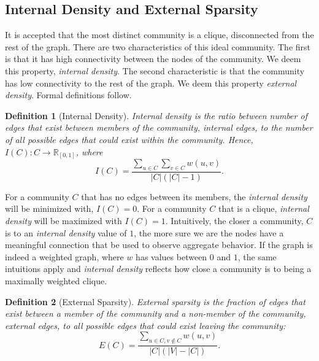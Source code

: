 \documentclass[phd,tocprelim]{cornell}
\newtheorem{definition}{Definition}
\begin{document}
\subsection{Internal Density and External Sparsity}

It is accepted that the most distinct community is a clique, disconnected from the rest of the graph.  There are two characteristics of this ideal community.  The first is that it has high connectivity between the nodes of the community.  We deem this property, {\it internal density}.  The second characteristic is that the community has low connectivity to the rest of the graph.  We deem this property {\it external density}.  Formal definitions follow.

\begin{definition}[Internal Density]
Internal density is the ratio between number of edges that exist between members of the community, {\it internal edges}, to the number of all possible edges that could exist within the community.  Hence, $I(C) : C \rightarrow \mathbb{R}_{[0, 1]}$, where
\begin{equation}
 I(C) =\frac{\sum_{u \in C} \sum_{v \in C} w(u,v)}{|C|(|C| - 1)} .
\end{equation}
\label{def_int_density}
\end{definition}

For a community $C$ that has no edges between its members, the {\it internal density} will be minimized with, $I(C) = 0$.  For a community $C$ that is a clique, {\it internal density} will be maximized with $I(C) = 1$.  Intuitively, the closer a community, $C$ is to an {\it internal density} value of $1$, the more sure we are the nodes have a meaningful connection that be used to observe aggregate behavior.  If the graph is indeed a weighted graph, where $w$ has values between $0$ and $1$, the same intuitions apply and {\it internal density} reflects how close a community is to being a maximally weighted clique.

\begin{definition}[External Sparsity]
External sparsity is the fraction of edges that exist between a member of the community and a non-member of the community, {\it external edges}, to all possible edges that could exist leaving the community:
\begin{equation}
 E(C) = \frac{\sum_{u \in C, v \notin C} w(u,v)}{|C|(|V| - |C|)}.
\end{equation}
\label{def_ext_density}
\end{definition}
\end{document}
